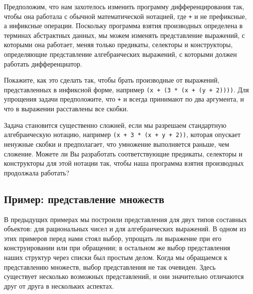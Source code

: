 \begin{exercise}{2.58}\label{EX2.58}%
%
%  
%
Предположим, что нам захотелось изменить программу
дифференцирования так, чтобы она работала с обычной математической
нотацией, где {\tt +} и {\tt *} не префиксные, а
инфиксные операции.  Поскольку программа взятия производных определена 
в терминах абстрактных данных, мы можем изменять представление
выражений, с которыми она работает, меняя только предикаты, селекторы
и конструкторы, определяющие представление алгебраических
выражений, с которыми должен работать дифференциатор.

\begin{plainenum}
\item
Покажите, как это сделать так, чтобы брать
производные от выражений, представленных в инфиксной форме, например
{\tt (x + (3 * (x + (y + 2))))}.  Для упрощения задачи
предположите, что {\tt +} и {\tt *} всегда принимают по
два аргумента, и что в выражении расставлены все скобки.

\item
 Задача становится существенно сложней, если мы
разрешаем стандартную алгебраическую нотацию, например
{\tt (x + 3 * (x + y + 2))}, которая опускает ненужные скобки и 
предполагает, что умножение выполняется раньше, чем сложение.  Можете
ли Вы разработать соответствующие предикаты, селекторы и конструкторы
для этой нотации так, чтобы наша программа взятия производных
продолжала работать?
\end{plainenum}
\end{exercise}

\subsection{Пример: представление множеств}
\label{EXAMPLE-REPRESENTING-SETS}

%
В предыдущих примерах мы построили представления для двух
типов составных объектов: для рациональных чисел и для алгебраических
выражений.  В одном из этих примеров перед нами стоял выбор, упрощать
ли выражение при его конструировании или при обращении; в остальном же
выбор представления наших структур через списки был простым делом.
Когда мы обращаемся к представлению множеств, выбор представления не
так очевиден.  Здесь существует несколько возможных представлений, и
они значительно отличаются друг от друга в нескольких аспектах.

